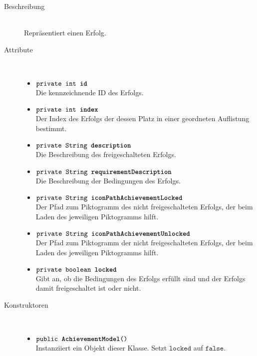 		\begin{description}
		\item[Beschreibung] \hfill \\ Repräsentiert einen Erfolg.
		\item[Attribute] \hfill \\
			\vspace{-.8cm}
			\begin{itemize}
				\item $\texttt{private int \textbf{id}}$ \\ Die kennzeichnende ID des Erfolgs.
				\item $\texttt{private int \textbf{index}}$ \\ Der Index des Erfolgs der dessen Platz in einer geordneten Auflistung bestimmt.
				\item $\texttt{private String \textbf{description}}$ \\ Die Beschreibung des freigeschalteten Erfolgs.
				\item $\texttt{private String \textbf{requirementDescription}}$ \\ Die Beschreibung der Bedingungen des Erfolgs.
				\item $\texttt{private String \textbf{iconPathAchievementLocked}}$ \\Der Pfad zum Piktogramm des nicht freigeschalteten Erfolgs, der beim Laden des jeweiligen Piktogramms hilft.
				\item $\texttt{private String \textbf{iconPathAchievementUnlocked}}$ \\ Der Pfad zum Piktogramm der nicht freigeschalteten Erfolgs, der beim Laden des jeweiligen Piktogramms hilft.
				\item $\texttt{private boolean \textbf{locked}}$ \\ Gibt an, ob die Bedingungen des Erfolgs erfüllt sind und der Erfolgs damit freigeschaltet ist oder nicht.
			\end{itemize}
			
		\item[Konstruktoren] \hfill \\
			\vspace{-.8cm}
			\begin{itemize}
				\item $\texttt{public \textbf{AchievementModel}()}$ \\ Instanziiert ein Objekt dieser Klasse. Setzt $\texttt{locked}$ auf $\texttt{false}$.
			\end{itemize}
			

\end{description}

